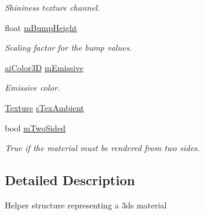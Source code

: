 \begin{DoxyCompactItemize}
\begin{DoxyCompactList}\small\item\em Shininess texture channel. \end{DoxyCompactList}\item 
\hypertarget{struct_assimp_1_1_d3_d_s_1_1_material_a7fa3f659d118b823724efdf11b410f05}{float \hyperlink{struct_assimp_1_1_d3_d_s_1_1_material_a7fa3f659d118b823724efdf11b410f05}{m\+Bump\+Height}}\label{struct_assimp_1_1_d3_d_s_1_1_material_a7fa3f659d118b823724efdf11b410f05}

\begin{DoxyCompactList}\small\item\em Scaling factor for the bump values. \end{DoxyCompactList}\item 
\hypertarget{struct_assimp_1_1_d3_d_s_1_1_material_a8f7dceae92cf6372e016415540878a2b}{\hyperlink{structai_color3_d}{ai\+Color3\+D} \hyperlink{struct_assimp_1_1_d3_d_s_1_1_material_a8f7dceae92cf6372e016415540878a2b}{m\+Emissive}}\label{struct_assimp_1_1_d3_d_s_1_1_material_a8f7dceae92cf6372e016415540878a2b}

\begin{DoxyCompactList}\small\item\em Emissive color. \end{DoxyCompactList}\item 
\hyperlink{struct_assimp_1_1_d3_d_s_1_1_texture}{Texture} \hyperlink{struct_assimp_1_1_d3_d_s_1_1_material_a429d8524c3df5f0c16bda979cb0640ce}{s\+Tex\+Ambient}
\item 
\hypertarget{struct_assimp_1_1_d3_d_s_1_1_material_acaee95982b7ec607075fd147524dd20c}{bool \hyperlink{struct_assimp_1_1_d3_d_s_1_1_material_acaee95982b7ec607075fd147524dd20c}{m\+Two\+Sided}}\label{struct_assimp_1_1_d3_d_s_1_1_material_acaee95982b7ec607075fd147524dd20c}

\begin{DoxyCompactList}\small\item\em True if the material must be rendered from two sides. \end{DoxyCompactList}\end{DoxyCompactItemize}


\subsection{Detailed Description}
Helper structure representing a 3ds material 

